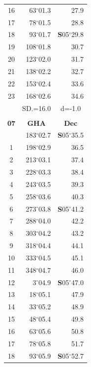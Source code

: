 \documentclass[10pt, a4paper]{report}
\begin{document}
\begin{scriptsize}
\begin{tabular*}{0.2\textwidth}[t]{@{\extracolsep{\fill}}|c|rr|}
16 & 63$^\circ$01.3 & 27.9\\
17 & 78$^\circ$01.5 & 28.8\\[2Pt]
18 & 93$^\circ$01.7 & \textbf{S}05$^\circ$29.8\\
19 & 108$^\circ$01.8 & 30.7\\
20 & 123$^\circ$02.0 & 31.7\\
21 & 138$^\circ$02.2 & \raisebox{0.24ex}{\boldmath$\cdot$~\boldmath$\cdot$~~}32.7\\
22 & 153$^\circ$02.4 & 33.6\\
23 & 168$^\circ$02.6 & 34.6\\
\hline
\rule{0pt}{2.4ex} & \multicolumn{1}{c}{SD.=16.0} & \multicolumn{1}{c|}{d=-1.0}\\
\hline
\multicolumn{1}{c}{}\\[-0.5ex]\hline
\multicolumn{1}{|c|}{\rule{0pt}{2.6ex}\textbf{07}} & \multicolumn{1}{c}{\textbf{GHA}} & \multicolumn{1}{c|}{\textbf{Dec}}\\
\hline\rule{0pt}{2.6ex}\noindent
0 & 183$^\circ$02.7 & \textbf{S}05$^\circ$35.5\\
1 & 198$^\circ$02.9 & 36.5\\
2 & 213$^\circ$03.1 & 37.4\\
3 & 228$^\circ$03.3 & \raisebox{0.24ex}{\boldmath$\cdot$~\boldmath$\cdot$~~}38.4\\
4 & 243$^\circ$03.5 & 39.3\\
5 & 258$^\circ$03.6 & 40.3\\[2Pt]
6 & 273$^\circ$03.8 & \textbf{S}05$^\circ$41.2\\
7 & 288$^\circ$04.0 & 42.2\\
8 & 303$^\circ$04.2 & 43.2\\
9 & 318$^\circ$04.4 & \raisebox{0.24ex}{\boldmath$\cdot$~\boldmath$\cdot$~~}44.1\\
10 & 333$^\circ$04.5 & 45.1\\
11 & 348$^\circ$04.7 & 46.0\\[2Pt]
12 & 3$^\circ$04.9 & \textbf{S}05$^\circ$47.0\\
13 & 18$^\circ$05.1 & 47.9\\
14 & 33$^\circ$05.2 & 48.9\\
15 & 48$^\circ$05.4 & \raisebox{0.24ex}{\boldmath$\cdot$~\boldmath$\cdot$~~}49.8\\
16 & 63$^\circ$05.6 & 50.8\\
17 & 78$^\circ$05.8 & 51.7\\[2Pt]
18 & 93$^\circ$05.9 & \textbf{S}05$^\circ$52.7\\

\end{tabular*}
\end{scriptsize}
\end{document}
